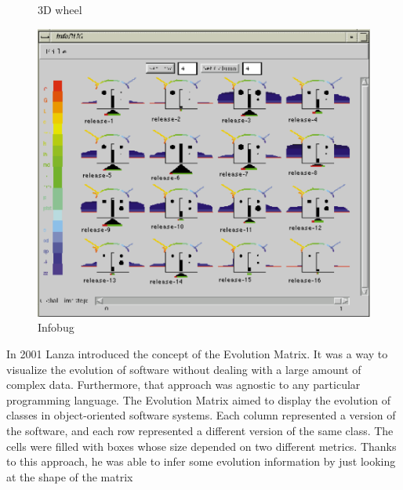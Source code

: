 \begin{figure}[H]
  \caption{3D wheel}
\endminipage\hfill
{}%
  \includegraphics[width=\linewidth]{Chuan3.png}
  \caption{Infobug}
\endminipage
\end{figure}


In 2001 Lanza \cite{Lanza2001} introduced the concept of the Evolution Matrix. It was a way to visualize the evolution of software without dealing with a large amount of complex data. Furthermore, that approach was agnostic to any particular programming language. The Evolution Matrix aimed to display the evolution of classes in object-oriented software systems. Each column represented a version of the software, and each row represented a different version of the same class. The cells were filled with boxes whose size depended on two different metrics. Thanks to this approach, he was able to infer some evolution information by just looking at the shape of the matrix

